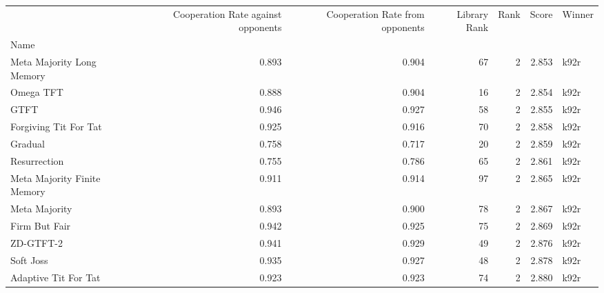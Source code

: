 \begin{tabular}{lrrrrrl}
\toprule
{} &  Cooperation Rate against opponents &  Cooperation Rate from opponents &  Library Rank &  Rank &  Score & Winner \\
Name                        &                                     &                                  &               &       &        &        \\
\midrule
Meta Majority Long Memory   &                               0.893 &                            0.904 &            67 &     2 &  2.853 &   k92r \\
Omega TFT                   &                               0.888 &                            0.904 &            16 &     2 &  2.854 &   k92r \\
GTFT                        &                               0.946 &                            0.927 &            58 &     2 &  2.855 &   k92r \\
Forgiving Tit For Tat       &                               0.925 &                            0.916 &            70 &     2 &  2.858 &   k92r \\
Gradual                     &                               0.758 &                            0.717 &            20 &     2 &  2.859 &   k92r \\
Resurrection                &                               0.755 &                            0.786 &            65 &     2 &  2.861 &   k92r \\
Meta Majority Finite Memory &                               0.911 &                            0.914 &            97 &     2 &  2.865 &   k92r \\
Meta Majority               &                               0.893 &                            0.900 &            78 &     2 &  2.867 &   k92r \\
Firm But Fair               &                               0.942 &                            0.925 &            75 &     2 &  2.869 &   k92r \\
ZD-GTFT-2                   &                               0.941 &                            0.929 &            49 &     2 &  2.876 &   k92r \\
Soft Joss                   &                               0.935 &                            0.927 &            48 &     2 &  2.878 &   k92r \\
Adaptive Tit For Tat        &                               0.923 &                            0.923 &            74 &     2 &  2.880 &   k92r \\

\end{tabular}
